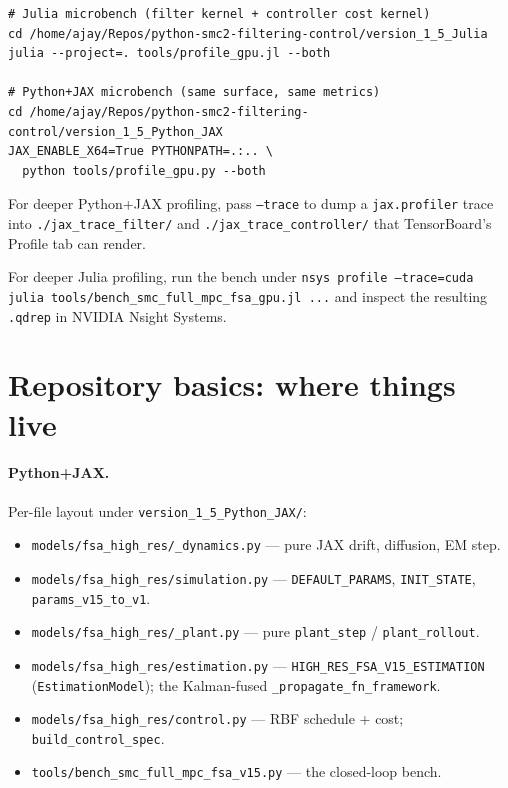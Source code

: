 \documentclass[11pt,a4paper]{article}
\begin{document}
\begin{lstlisting}
# Julia microbench (filter kernel + controller cost kernel)
cd /home/ajay/Repos/python-smc2-filtering-control/version_1_5_Julia
julia --project=. tools/profile_gpu.jl --both

# Python+JAX microbench (same surface, same metrics)
cd /home/ajay/Repos/python-smc2-filtering-control/version_1_5_Python_JAX
JAX_ENABLE_X64=True PYTHONPATH=.:.. \
  python tools/profile_gpu.py --both
\end{lstlisting}

For deeper Python+JAX profiling, pass \texttt{--trace} to dump a
\texttt{jax.profiler} trace into \texttt{./jax\_trace\_filter/}
and \texttt{./jax\_trace\_controller/} that TensorBoard's Profile
tab can render.

For deeper Julia profiling, run the bench under
\texttt{nsys profile --trace=cuda julia tools/bench\_smc\_full\_mpc\_fsa\_gpu.jl ...}
and inspect the resulting \texttt{.qdrep} in NVIDIA Nsight Systems.

\section{Repository basics: where things live}

\paragraph{Python+JAX.} Per-file layout under
\texttt{version\_1\_5\_Python\_JAX/}:

\begin{itemize}[itemsep=2pt]
  \item \texttt{models/fsa\_high\_res/\_dynamics.py} --- pure JAX
        drift, diffusion, EM step.
  \item \texttt{models/fsa\_high\_res/simulation.py} ---
        \texttt{DEFAULT\_PARAMS}, \texttt{INIT\_STATE},
        \texttt{params\_v15\_to\_v1}.
  \item \texttt{models/fsa\_high\_res/\_plant.py} --- pure
        \texttt{plant\_step} / \texttt{plant\_rollout}.
  \item \texttt{models/fsa\_high\_res/estimation.py} ---
        \texttt{HIGH\_RES\_FSA\_V15\_ESTIMATION}
        (\texttt{EstimationModel}); the Kalman-fused
        \texttt{\_propagate\_fn\_framework}.
  \item \texttt{models/fsa\_high\_res/control.py} --- RBF schedule
        + cost; \texttt{build\_control\_spec}.
  \item \texttt{tools/bench\_smc\_full\_mpc\_fsa\_v15.py} --- the
        closed-loop bench.
\end{itemize}
\end{document}
